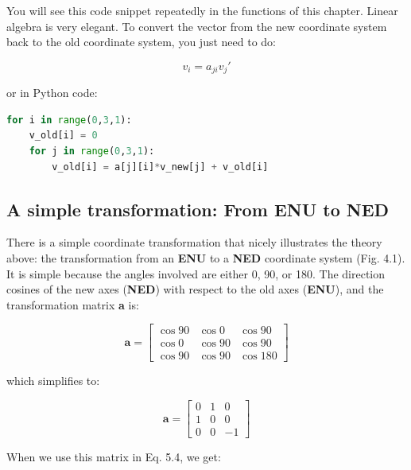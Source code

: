 \documentclass[a4paper , 12pt]{book}
\begin{document}
You will see this code snippet repeatedly in the functions of this chapter. Linear algebra is very elegant. To convert the vector from the new coordinate system back to the old coordinate system, you just need to do:

\begin{equation}
    v_i=a_{ji}v_j\text{$'$}
\end{equation}

or in Python code:

\begin{center}
\begin{lstlisting}[language=Python, frame=single]
for i in range(0,3,1):
    v_old[i] = 0
    for j in range(0,3,1):
        v_old[i] = a[j][i]*v_new[j] + v_old[i]
\end{lstlisting}
\end{center}

\subsection{A simple transformation: From \textbf{ENU} to \textbf{NED}}

There is a simple coordinate transformation that nicely illustrates the theory above: the transformation from an \textbf{ENU} to a \textbf{NED} coordinate system (Fig. 4.1). It is simple because the angles involved are either 0, 90, or 180\degree. The direction cosines of the new axes (\textbf{NED}) with respect to the old axes (\textbf{ENU}), and the transformation matrix \textbf{a} is:

\begin{equation}
    \textbf{a}=
    \begin{bmatrix}
    \cos{90} & \cos{0} & \cos{90} \\
    \cos{0} & \cos{90} & \cos{90} \\
    \cos{90} & \cos{90} & \cos{180}
\end{bmatrix}
\end{equation}

which simplifies to:

\begin{equation}
    \textbf{a}=
    \begin{bmatrix}
    0 & 1 & 0 \\
    1 & 0 & 0 \\
    0 & 0 & -1
\end{bmatrix}
\end{equation}

When we use this matrix in Eq. 5.4, we get:
\end{document}
